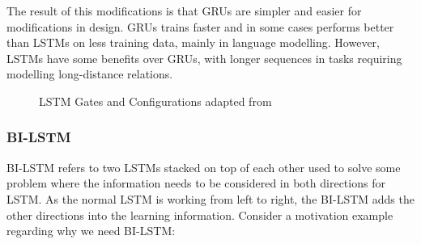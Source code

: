 The result of this modifications is that GRUs are simpler and easier for modifications in design. GRUs trains faster and in some cases performs better than LSTMs on less training data, mainly in language modelling. However, LSTMs have some benefits over GRUs, with longer sequences in tasks requiring modelling long-distance relations.
\begin{figure}[!ht]
	\centering
	\caption{LSTM Gates and Configurations adapted from~\cite{colah}}
\end{figure}%

\subsubsection{BI-LSTM}\label{Sec:Bi_Lstm}

BI-LSTM refers to two LSTMs stacked on top of each other used to solve some problem where the information needs to be considered in both directions for LSTM. As the normal LSTM is working from left to right, the BI-LSTM adds the other directions into the learning information. Consider a motivation example regarding why we need BI-LSTM:

